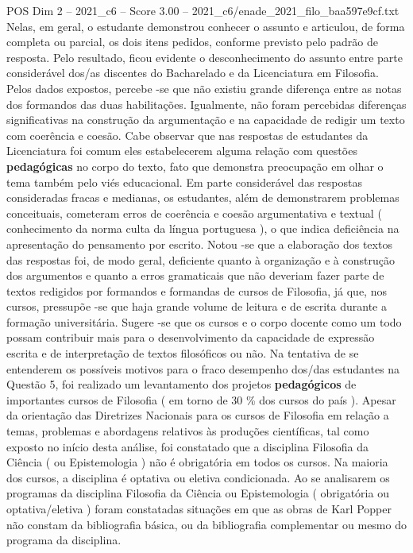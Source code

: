 \begin{textsample}{POS Dim 2 – 2021\_c6 – Score 3.00 – 2021\_c6/enade\_2021\_filo\_baa597e9cf.txt}
Nelas, em geral, o estudante demonstrou conhecer o assunto e articulou, de forma completa ou parcial, os dois itens pedidos, conforme previsto pelo padrão de resposta.
Pelo resultado, ficou evidente o desconhecimento do assunto entre parte considerável dos/as discentes do Bacharelado e da Licenciatura em Filosofia.
Pelos dados expostos, percebe -se que não existiu grande diferença entre as notas dos formandos das duas habilitações.
Igualmente, não foram percebidas diferenças significativas na construção da argumentação e na capacidade de redigir um texto com coerência e coesão.
Cabe observar que nas respostas de estudantes da Licenciatura foi comum eles estabelecerem alguma relação com questões \textbf{pedagógicas} no corpo do texto, fato que demonstra preocupação em olhar o tema também pelo viés educacional.
Em parte considerável das respostas consideradas fracas e medianas, os estudantes, além de demonstrarem problemas conceituais, cometeram erros de coerência e coesão argumentativa e textual ( conhecimento da norma culta da língua portuguesa ), o que indica deficiência na apresentação do pensamento por escrito.
Notou -se que a elaboração dos textos das respostas foi, de modo geral, deficiente quanto à organização e à construção dos argumentos e quanto a erros gramaticais que não deveriam fazer parte de textos redigidos por formandos e formandas de cursos de Filosofia, já que, nos cursos, pressupõe -se que haja grande volume de leitura e de escrita durante a formação universitária.
Sugere -se que os cursos e o corpo docente como um todo possam contribuir mais para o desenvolvimento da capacidade de expressão escrita e de interpretação de textos filosóficos ou não.
Na tentativa de se entenderem os possíveis motivos para o fraco desempenho dos/das estudantes na Questão 5, foi realizado um levantamento dos projetos \textbf{pedagógicos} de importantes cursos de Filosofia ( em torno de 30 \% dos cursos do país ).
Apesar da orientação das Diretrizes Nacionais para os cursos de Filosofia em relação a temas, problemas e abordagens relativos às produções científicas, tal como exposto no início desta análise, foi constatado que a disciplina Filosofia da Ciência ( ou Epistemologia ) não é obrigatória em todos os cursos.
Na maioria dos cursos, a disciplina é optativa ou eletiva condicionada.
Ao se analisarem os programas da disciplina Filosofia da Ciência ou Epistemologia ( obrigatória ou optativa/eletiva ) foram constatadas situações em que as obras de Karl Popper não constam da bibliografia básica, ou da bibliografia complementar ou mesmo do programa da disciplina.

\end{textsample}
